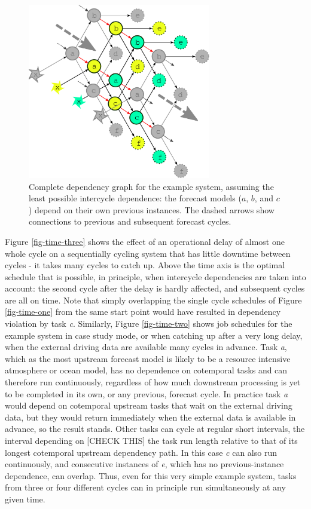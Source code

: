 \documentclass[11pt,a4paper]{article}
\begin{document}
\begin{figure} 
    \begin{center}
        \includegraphics[width=8cm]{inkscape-svg/dep-multi-cycle} 
    \end{center}
    \caption{\small Complete dependency graph for the example
    system, assuming the least possible intercycle dependence: the
    forecast models ($a$, $b$, and $c$) depend on their own previous
    instances. The dashed arrows show connections to previous and
    subsequent forecast cycles.} 
    \label{fig-dep-two}
\end{figure}



Figure \ref{fig-time-three} shows the effect of an operational delay of
almost one whole cycle on a sequentially cycling system that has little
downtime between cycles - it takes many cycles to catch up. Above the
time axis is the optimal schedule that is possible, in principle, when
intercycle dependencies are taken into account: the second cycle after
the delay is hardly affected, and subsequent cycles are all on time.
Note that simply overlapping the single cycle schedules of Figure
\ref{fig-time-one} from the same start point would have resulted in
dependency violation by task {\em c}. Similarly, Figure
\ref{fig-time-two} shows job schedules for the example system in case
study mode, or when catching up after a very long delay, when the
external driving data are available many cycles in advance.  Task {\em
a}, which as the most upstream forecast model is likely to be a resource
intensive atmosphere or ocean model, has no dependence on cotemporal
tasks and can therefore run continuously, regardless of how much
downstream processing is yet to be completed in its own, or any
previous, forecast cycle. In practice task {\em a} would depend on
cotemporal upstream tasks that wait on the external driving data, but
they would return immediately when the external data is available in
advance, so the result stands. Other tasks can cycle at regular short
intervals, the interval depending on [CHECK THIS] the task run length
relative to that of its longest cotemporal upstream dependency path. In
this case {\em c} can also run continuously, and consecutive instances
of {\em e}, which has no previous-instance dependence, can overlap.
Thus, even for this very simple example system, tasks from three or four
different cycles can in principle run simultaneously at any given
time. 
\end{document}
